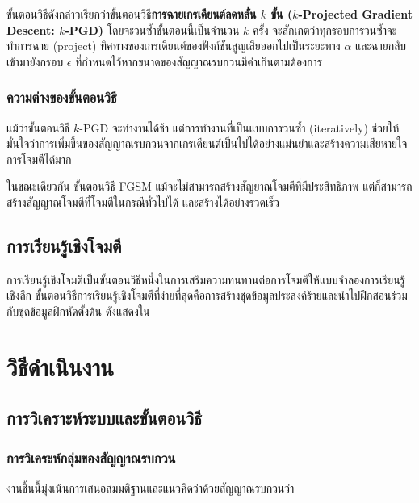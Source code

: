 \documentclass{cpereport}
\begin{document}
ขั้นตอนวิธีดังกล่าวเรียกว่าขั้นตอนวิธี\textbf{การฉายเกรเดียนต์ลดหลั่น $k$ ขั้น ($k$-Projected Gradient Descent: $k$-PGD)} โดยจะวนซ้ำขั้นตอนนี้เป็นจำนวน $k$ ครั้ง จะสักเกตว่าทุกรอบการวนซ้ำจะทำการฉาย (project) ทิศทางของเกรเดียนต์ของฟังก์ชันสูญเสียออกไปเป็นระยะทาง $\alpha$ และฉายกลับเข้ามายังกรอบ $\epsilon$ ที่กำหนดไว้หากขนาดของสัญญาณรบกวนมีค่าเกินตามต้องการ

\subsection{ความต่างของขั้นตอนวิธี}

แม้ว่าขั้นตอนวิธี $k$-PGD จะทำงานได้ช้า แต่การทำงานที่เป็นแบบการวนซ้ำ (iteratively) ช่วยให้มั่นใจว่าการเพิ่มขึ้นของสัญญาณรบกวนจากเกรเดียนต์เป็นไปได้อย่างแม่นยำและสร้างความเสียหายใจการโจมตีได้มาก

ในขณะเดียวกัน ขั้นตอนวิธี FGSM แม้จะไม่สามารถสร้างสัญยาณโจมตีที่มีประสิทธิภาพ แต่ก็สามารถสร้างสัญญาณโจมตีที่โจมตีในกรณีทั่วไปได้ และสร้างได้อย่างรวดเร็ว

\section{การเรียนรู้เชิงโจมตี}

การเรียนรู้เชิงโจมตีเป็นขั้นตอนวิธีหนึ่งในการเสริมความทนทานต่อการโจมตีให้แบบจำลองการเรียนรู้เชิงลึก ขั้นตอนวิธีการเรียนรู้เชิงโจมตีที่ง่ายที่สุดคือการสร้างชุดข้อมูลประสงค์ร้ายและนำไปฝึกสอนร่วมกับชุดข้อมูลฝึกหัดตั้งต้น ดังแสดงใน


\chapter{วิธีดำเนินงาน}

\section{การวิเคราะห์ระบบและขั้นตอนวิธี}

\subsection{การวิเคระห์กลุ่มของสัญญาณรบกวน}

งานชิ้นนี้มุ่งเน้นการเสนอสมมติฐานและแนวคิดว่าด้วยสัญญาณรบกวนว่า
\end{document}
